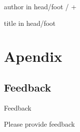 \documentclass[english,aspectratio=169]{beamer}
\begin{document}
\appendix
{%
\begin{beamercolorbox}[wd=0.5\textwidth,ht=3ex,dp=1.5ex,leftskip=.5em,rightskip=.5em]{author in head/foot}%
%
\insertframenumber{} / \insertmainframenumber{} + \insertappendixframenumber{}\hfill\insertshortauthor%
\end{beamercolorbox}%
\vspace*{-4.5ex}\hspace*{0.5\textwidth}%
\begin{beamercolorbox}[wd=0.5\textwidth,ht=3ex,dp=1.5ex,left,leftskip=.5em]{title in head/foot}%
%
\insertshorttitle%
\end{beamercolorbox}%
}
\beamerdefaultoverlayspecification{}

\section*{Apendix}

\subsection*{Feedback}
\begin{frame}{Feedback}
\begin{center}
{  Please provide feedback}
\end{center}
\end{frame}
\end{document}
